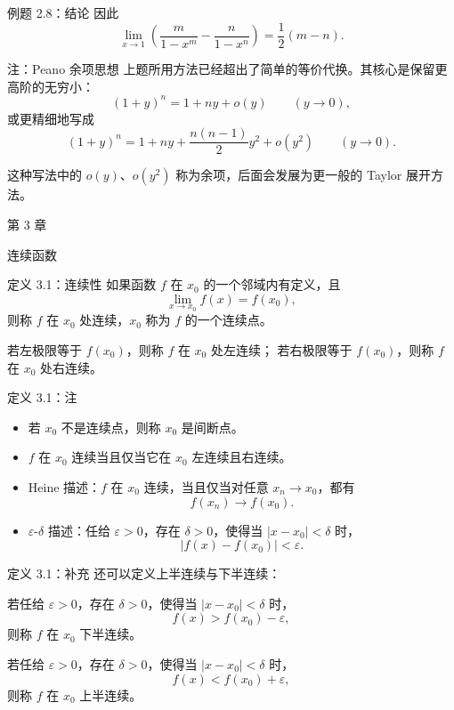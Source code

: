 ﻿\documentclass[aspectratio=169,11pt]{ctexbeamer}
\begin{document}
\begin{frame}{例题 2.8：结论}
因此
\[
  \lim_{x\to 1}\left(\frac{m}{1-x^m}-\frac{n}{1-x^n}\right)
  =
  \frac12(m-n).
\]
\end{frame}

\begin{frame}{注：Peano 余项思想}
上题所用方法已经超出了简单的等价代换。其核心是保留更高阶的无穷小：
\[
  (1+y)^n=1+ny+o(y)\qquad (y\to 0),
\]
或更精细地写成
\[
  (1+y)^n
  =
  1+ny+\frac{n(n-1)}{2}y^2+o(y^2)\qquad (y\to 0).
\]

\vspace{0.6em}
这种写法中的 $o(y)$、$o(y^2)$ 称为余项，后面会发展为更一般的 Taylor 展开方法。
\end{frame}

\begin{frame}
  \centering
  \vspace{2cm}
  {\LARGE 第 3 章}

  \vspace{0.8cm}
  {\Huge 连续函数}
\end{frame}

\begin{frame}{定义 3.1：连续性}
如果函数 $f$ 在 $x_0$ 的一个邻域内有定义，且
\[
  \lim_{x\to x_0}f(x)=f(x_0),
\]
则称 $f$ 在 $x_0$ 处连续，$x_0$ 称为 $f$ 的一个连续点。

\vspace{0.6em}
若左极限等于 $f(x_0)$，则称 $f$ 在 $x_0$ 处左连续；
若右极限等于 $f(x_0)$，则称 $f$ 在 $x_0$ 处右连续。
\end{frame}

\begin{frame}{定义 3.1：注}
\begin{itemize}
  \item 若 $x_0$ 不是连续点，则称 $x_0$ 是间断点。
  \item $f$ 在 $x_0$ 连续当且仅当它在 $x_0$ 左连续且右连续。
  \item Heine 描述：$f$ 在 $x_0$ 连续，当且仅当对任意 $x_n\to x_0$，都有
  \[
    f(x_n)\to f(x_0).
  \]
  \item $\varepsilon$-$\delta$ 描述：任给 $\varepsilon>0$，存在 $\delta>0$，使得当 $|x-x_0|<\delta$ 时，
  \[
    |f(x)-f(x_0)|<\varepsilon.
  \]
\end{itemize}
\end{frame}

\begin{frame}{定义 3.1：补充}
还可以定义上半连续与下半连续：

\vspace{0.6em}
若任给 $\varepsilon>0$，存在 $\delta>0$，使得当 $|x-x_0|<\delta$ 时，
\[
  f(x)>f(x_0)-\varepsilon,
\]
则称 $f$ 在 $x_0$ 下半连续。

\vspace{0.6em}
若任给 $\varepsilon>0$，存在 $\delta>0$，使得当 $|x-x_0|<\delta$ 时，
\[
  f(x)<f(x_0)+\varepsilon,
\]
则称 $f$ 在 $x_0$ 上半连续。
\end{frame}
\end{document}
